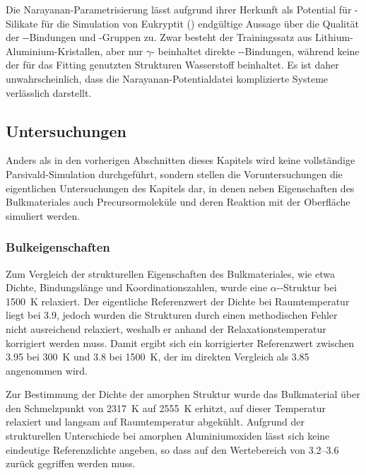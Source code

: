 Die Narayanan-Parametrisierung lässt aufgrund ihrer Herkunft als Potential für -Silikate für die Simulation von Eukryptit () endgültige Aussage über die Qualität der --Bindungen und -Gruppen zu.
Zwar besteht der Trainingssatz aus Lithium-Aluminium-Kristallen, aber nur $\gamma$- beinhaltet direkte --Bindungen, während keine der für das Fitting genutzten Strukturen Wasserstoff beinhaltet.
Es ist daher unwahrscheinlich, dass die Narayanan-Potentialdatei komplizierte Systeme verlässlich darstellt.

\subsection{Untersuchungen}

Anders als in den vorherigen Abschnitten dieses Kapitels wird keine vollständige Parsivald-Simulation durchgeführt, sondern stellen die Voruntersuchungen die eigentlichen Untersuchungen des Kapitels dar, in denen neben Eigenschaften des Bulkmateriales auch Precursormoleküle und deren Reaktion mit der Oberfläche simuliert werden.

\subsubsection{Bulkeigenschaften}

Zum Vergleich der strukturellen Eigenschaften des Bulkmateriales, wie etwa Dichte, Bindungslänge und Koordinationszahlen, wurde eine $\alpha$--Struktur bei \SI{1500}{\kelvin} relaxiert.
Der eigentliche Referenzwert der Dichte bei Raumtemperatur liegt bei \SI{3.9}{\gpcc}, jedoch wurden die Strukturen durch einen methodischen Fehler nicht ausreichend relaxiert, weshalb er anhand der Relaxationstemperatur korrigiert werden muss.
Damit ergibt sich ein korrigierter Referenzwert zwischen \SI{3.95}{\gpcc} bei \SI{300}{\kelvin} und \SI{3.8}{\gpcc} bei \SI{1500}{\kelvin}\cite{fiquet_temperature_1999}, der im direkten Vergleich als \SI{3.85}{\gpcc} angenommen wird.

Zur Bestimmung der Dichte der amorphen Struktur wurde das Bulkmaterial über den Schmelzpunkt von \SI{2317}{\kelvin} auf \SI{2555}{\kelvin} erhitzt, auf dieser Temperatur relaxiert und langsam auf Raumtemperatur abgekühlt.
Aufgrund der strukturellen Unterschiede bei amorphen Aluminiumoxiden lässt sich keine eindeutige Referenzdichte angeben, so dass auf den Wertebereich von \SIrange{3.2}{3.6}{\gpcc} zurück gegriffen werden muss.

